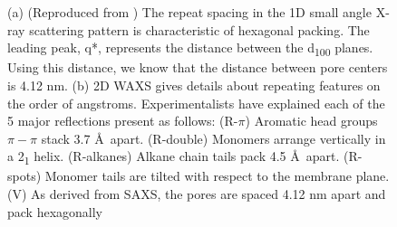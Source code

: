 \documentclass[journal=jpcbfk,manuscript=article]{achemso}
\begin{document}
\begin{figure}[!htb]
\begin{subfigure}[t]{0.495\linewidth}
                \caption{}\label{fig:WAXS}
        \end{subfigure}
	\caption{(a) (Reproduced from ) The repeat spacing
		in the 1D small angle X-ray scattering pattern is characteristic of hexagonal
		packing. The leading peak, q*, represents the distance between the
		d\textsubscript{100} planes. Using this distance, we know that the distance
		between pore centers is 4.12 nm. (b) 2D WAXS gives
		details about repeating features on the order of angstroms. Experimentalists
		have explained each of the 5 major reflections present as follows: (R-$\pi$) Aromatic
		head groups $\pi-\pi$ stack 3.7 \AA~apart. (R-double) Monomers arrange vertically in
		a 2\textsubscript{1} helix. (R-alkanes) Alkane chain tails pack 4.5 \AA~apart. (R-spots)
		Monomer tails are tilted with respect to the membrane plane. (V) As derived from
		SAXS, the pores are spaced 4.12 nm apart and pack hexagonally}
	\label{fig:SWAXS}
 \end{figure}
  
\end{document}
